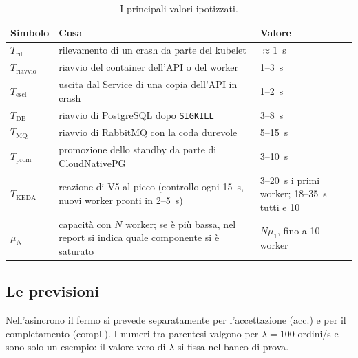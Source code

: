 \begin{table}[H]
\centering
\caption{I principali valori ipotizzati.}
\label{tab:ipotesi}
\begin{tabularx}{\linewidth}{@{}lLl@{}}
\toprule
\textbf{Simbolo} & \textbf{Cosa} & \textbf{Valore} \\
\midrule
$T_{\text{ril}}$ & rilevamento di un crash da parte del kubelet & $\approx 1$~s \\
$T_{\text{riavvio}}$ & riavvio del container dell'API o del worker & 1--3~s \\
$T_{\text{escl}}$ & uscita dal Service di una copia dell'API in crash & 1--2~s \\
$T_{\text{DB}}$ & riavvio di PostgreSQL dopo \texttt{SIGKILL} & 3--8~s \\
$T_{\text{MQ}}$ & riavvio di RabbitMQ con la coda durevole & 5--15~s \\
$T_{\text{prom}}$ & promozione dello standby da parte di CloudNativePG & 3--10~s \\
$T_{\text{KEDA}}$ & reazione di V5 al picco (controllo ogni 15~s, nuovi worker pronti in 2--5~s) & 3--20~s i primi worker; 18--35~s tutti e 10 \\
$\mu_N$ & capacità con $N$ worker; se è più bassa, nel report si indica quale componente si è saturato & $N\mu_1$, fino a 10 worker \\
\bottomrule
\end{tabularx}
\end{table}

\subsection{Le previsioni}

Nell'asincrono il fermo si prevede separatamente per l'accettazione (acc.) e per il completamento (compl.). I numeri tra parentesi valgono per $\lambda = 100$ ordini/s e sono solo un esempio: il valore vero di $\lambda$ si fissa nel banco di prova.


